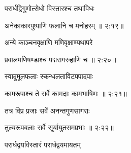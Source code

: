 {\devanagarifont परार्धद्विगुणोत्सेधो विस्तारश्च तथाविधः \thinspace{\dandab} \dontdisplaylinenum }%


{\devanagarifont अनेकाकारपुष्पाणि फलानि च मनोहरम् {॥ २:१९॥} \veg\dontdisplaylinenum }%

{\devanagarifont अन्ये काञ्चनवृक्षाणि मणिवृक्षाण्यथापरे \thinspace{\dandab} \dontdisplaylinenum }%


{\devanagarifont प्रवालमणिषण्डाश्च पद्मरागरुहाणि च {॥ २:२०॥} \veg\dontdisplaylinenum }%

{\devanagarifont स्वादुमूलफलाः स्कन्धलताविटपपादपाः \thinspace{\dandab} \dontdisplaylinenum }%


{\devanagarifont कामरूपाश्च ते सर्वे कामदाः कामभाषिणः {॥ २:२१॥} \veg\dontdisplaylinenum }%
  
{\devanagarifont तत्र विप्र प्रजाः सर्वे अनन्तगुणसागराः \thinspace{\dandab} \dontdisplaylinenum }%
 

{\devanagarifont तुल्यरूपबलाः सर्वे सूर्यायुतसमप्रभाः {॥ २:२२॥} \veg\dontdisplaylinenum }%

{\devanagarifont परार्धद्वयविस्तारं परार्धद्वयमायतम् \thinspace{\dandab} \dontdisplaylinenum }%
 
